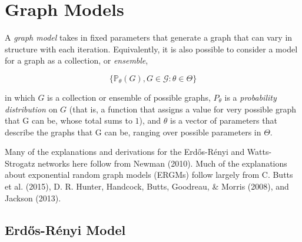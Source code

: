\documentclass[12pt,twoside]{amherstthesis}
\begin{document}
  \chapter{Graph Models}\label{graph-models}
  
  A \emph{graph model} takes in fixed parameters that generate a graph
  that can vary in structure with each iteration. Equivalently, it is also
  possible to consider a model for a graph as a collection, or
  \emph{ensemble},
  
  \[\{\mathbb{P}_{\theta}(G), G \in \mathcal{G}: \theta \in \Theta\}\]
  
  in which \(G\) is a collection or ensemble of possible graphs,
  \(P_\theta\) is a \emph{probability distribution} on \(G\) (that is, a
  function that assigns a value for very possible graph that G can be,
  whose total sums to \(1\)), and \(\theta\) is a vector of parameters
  that describe the graphs that G can be, ranging over possible parameters
  in \(\Theta\).
  
  Many of the explanations and derivations for the Erdős-Rényi and
  Watts-Strogatz networks here follow from Newman (2010). Much of the
  explanations about exponential random graph models (ERGMs) follow
  largely from C. Butts et al. (2015), D. R. Hunter, Handcock, Butts,
  Goodreau, \& Morris (2008), and Jackson (2013).
  
  \section{Erdős-Rényi Model}\label{erdos-renyi-model}
  
\end{document}
